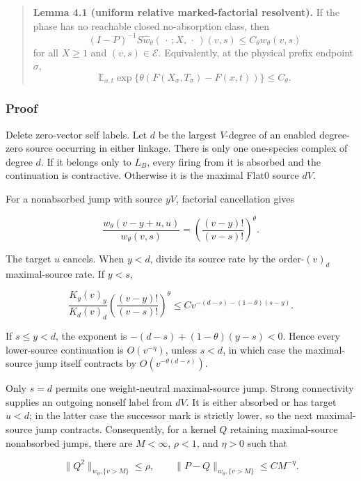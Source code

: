 \begin{quote}
\textbf{Lemma 4.1 (uniform relative marked-factorial resolvent).} If the
phase has no reachable closed no-absorption class, then \[
      (I-P)^{-1}S\widehat w_\theta(\,\cdot\,;X,\,\cdot\,)(v,s)
         \le C_\theta w_\theta(v,s)                 \tag{4.3}
\] for all \(X\ge1\) and \((v,s)\in\mathcal E\). Equivalently, at the
physical prefix endpoint \(\sigma\), \[
      \mathbb E_{x,t}
         \exp\{\theta(F(X_\sigma,T_\sigma)-F(x,t))\}
            \le C_\theta.                           \tag{4.4}
\]
\end{quote}

\subsubsection{Proof}

Delete zero-vector self labels. Let \(d\) be the largest \(V\)-degree of
an enabled degree-zero source occurring in either linkage. There is only
one one-species complex of degree \(d\). If it belongs only to \(L_B\),
every firing from it is absorbed and the continuation is contractive.
Otherwise it is the maximal Flat0 source \(dV\).

For a nonabsorbed jump with source \(yV\), factorial cancellation gives

\[
 \frac{w_\theta(v-y+u,u)}{w_\theta(v,s)}
       =\left(\frac{(v-y)!}{(v-s)!}\right)^\theta.    \tag{4.5}
\]

The target \(u\) cancels. When \(y<d\), divide its source rate by the
order-\((v)_d\) maximal-source rate. If \(y<s\),

\[
 \frac{K_y(v)_y}{K_d(v)_d}
 \left(\frac{(v-y)!}{(v-s)!}\right)^\theta
       \le C v^{-(d-s)-(1-\theta)(s-y)}.             \tag{4.6}
\]

If \(s\le y<d\), the exponent is \(-(d-s)+(1-\theta)(y-s)<0\). Hence
every lower-source continuation is \(O(v^{-\eta})\), unless \(s<d\), in
which case the maximal-source jump itself contracts by
\(O(v^{-\theta(d-s)})\).

Only \(s=d\) permits one weight-neutral maximal-source jump. Strong
connectivity supplies an outgoing nonself label from \(dV\). It is
either absorbed or has target \(u<d\); in the latter case the successor
mark is strictly lower, so the next maximal-source jump contracts.
Consequently, for a kernel \(Q\) retaining maximal-source nonabsorbed
jumps, there are \(M<\infty\), \(\rho<1\), and \(\eta>0\) such that

\[
       \|Q^2\|_{w_\theta,\{v>M\}}\le\rho,\qquad
       \|P-Q\|_{w_\theta,\{v>M\}}\le C M^{-\eta}.     \tag{4.7}
\]

